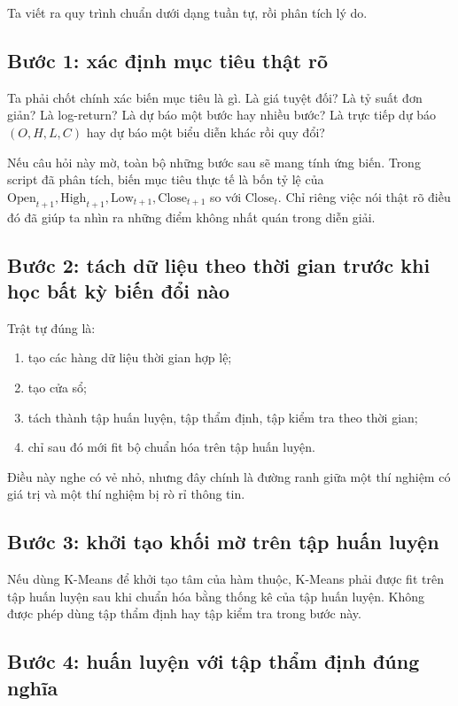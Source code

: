 Ta viết ra quy trình chuẩn dưới dạng tuần tự, rồi phân tích lý do.

\subsection{Bước 1: xác định mục tiêu thật rõ}

Ta phải chốt chính xác biến mục tiêu là gì. Là giá tuyệt đối? Là tỷ suất đơn giản? Là log-return? Là dự báo một bước hay nhiều bước? Là trực tiếp dự báo \((O,H,L,C)\) hay dự báo một biểu diễn khác rồi quy đổi?

Nếu câu hỏi này mờ, toàn bộ những bước sau sẽ mang tính ứng biến. Trong script đã phân tích, biến mục tiêu thực tế là bốn tỷ lệ của \(\text{Open}_{t+1}, \text{High}_{t+1}, \text{Low}_{t+1}, \text{Close}_{t+1}\) so với \(\text{Close}_t\). Chỉ riêng việc nói thật rõ điều đó đã giúp ta nhìn ra những điểm không nhất quán trong diễn giải.

\subsection{Bước 2: tách dữ liệu theo thời gian trước khi học bất kỳ biến đổi nào}

Trật tự đúng là:

\begin{enumerate}
\item tạo các hàng dữ liệu thời gian hợp lệ;
\item tạo cửa sổ;
\item tách thành tập huấn luyện, tập thẩm định, tập kiểm tra theo thời gian;
\item chỉ sau đó mới fit bộ chuẩn hóa trên tập huấn luyện.
\end{enumerate}

Điều này nghe có vẻ nhỏ, nhưng đây chính là đường ranh giữa một thí nghiệm có giá trị và một thí nghiệm bị rò rỉ thông tin.

\subsection{Bước 3: khởi tạo khối mờ trên tập huấn luyện}

Nếu dùng K-Means để khởi tạo tâm của hàm thuộc, K-Means phải được fit trên tập huấn luyện sau khi chuẩn hóa bằng thống kê của tập huấn luyện. Không được phép dùng tập thẩm định hay tập kiểm tra trong bước này.

\subsection{Bước 4: huấn luyện với tập thẩm định đúng nghĩa}

